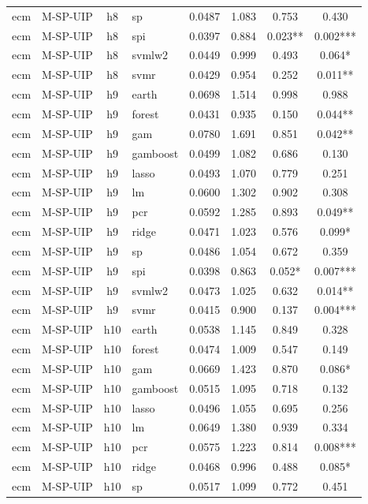 \begin{ThreePartTable}
\begin{longtable}[t]{llclcccc}
ecm & M-SP-UIP & h8 & sp & 0.0487 & 1.083 & 0.753 & 0.430\\
ecm & M-SP-UIP & h8 & spi & 0.0397 & 0.884 & 0.023** & 0.002***\\
ecm & M-SP-UIP & h8 & svmlw2 & 0.0449 & 0.999 & 0.493 & 0.064*\\
ecm & M-SP-UIP & h8 & svmr & 0.0429 & 0.954 & 0.252 & 0.011**\\
\addlinespace
ecm & M-SP-UIP & h9 & earth & 0.0698 & 1.514 & 0.998 & 0.988\\
ecm & M-SP-UIP & h9 & forest & 0.0431 & 0.935 & 0.150 & 0.044**\\
ecm & M-SP-UIP & h9 & gam & 0.0780 & 1.691 & 0.851 & 0.042**\\
ecm & M-SP-UIP & h9 & gamboost & 0.0499 & 1.082 & 0.686 & 0.130\\
ecm & M-SP-UIP & h9 & lasso & 0.0493 & 1.070 & 0.779 & 0.251\\
ecm & M-SP-UIP & h9 & lm & 0.0600 & 1.302 & 0.902 & 0.308\\
ecm & M-SP-UIP & h9 & pcr & 0.0592 & 1.285 & 0.893 & 0.049**\\
ecm & M-SP-UIP & h9 & ridge & 0.0471 & 1.023 & 0.576 & 0.099*\\
ecm & M-SP-UIP & h9 & sp & 0.0486 & 1.054 & 0.672 & 0.359\\
ecm & M-SP-UIP & h9 & spi & 0.0398 & 0.863 & 0.052* & 0.007***\\
ecm & M-SP-UIP & h9 & svmlw2 & 0.0473 & 1.025 & 0.632 & 0.014**\\
ecm & M-SP-UIP & h9 & svmr & 0.0415 & 0.900 & 0.137 & 0.004***\\
\addlinespace
ecm & M-SP-UIP & h10 & earth & 0.0538 & 1.145 & 0.849 & 0.328\\
ecm & M-SP-UIP & h10 & forest & 0.0474 & 1.009 & 0.547 & 0.149\\
ecm & M-SP-UIP & h10 & gam & 0.0669 & 1.423 & 0.870 & 0.086*\\
ecm & M-SP-UIP & h10 & gamboost & 0.0515 & 1.095 & 0.718 & 0.132\\
ecm & M-SP-UIP & h10 & lasso & 0.0496 & 1.055 & 0.695 & 0.256\\
ecm & M-SP-UIP & h10 & lm & 0.0649 & 1.380 & 0.939 & 0.334\\
ecm & M-SP-UIP & h10 & pcr & 0.0575 & 1.223 & 0.814 & 0.008***\\
ecm & M-SP-UIP & h10 & ridge & 0.0468 & 0.996 & 0.488 & 0.085*\\
ecm & M-SP-UIP & h10 & sp & 0.0517 & 1.099 & 0.772 & 0.451\\

\end{longtable}
\end{ThreePartTable}
